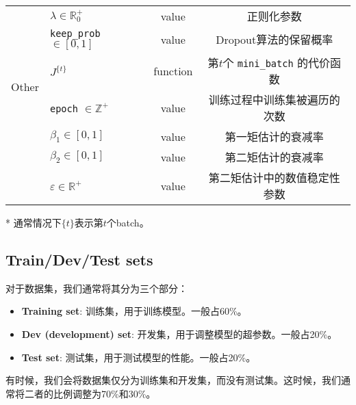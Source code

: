 \begin{table}[htb!]
\begin{threeparttable}
\begin{tabular}{clcc}
        \midrule
        \multirow{6}{*}{Other}      & $\lambda \in \mathbb{R}^+_0$                                                          & value                & 正则化参数                                                             \\  
                                    & \verb|keep_prob| $\in [0,1]$                                                          & value                & Dropout算法的保留概率                                                   \\ 
                                    & $J^{\{t\}}$                                                                           & function             & 第$t$个 \verb|mini_batch| 的代价函数                                   \\  
                                    & \verb|epoch| $\in \mathbb{Z}^+$                                                       & value                & 训练过程中训练集被遍历的次数                                           \\
                                    & $\beta_1 \in [0,1]$                                                                   & value                & 第一矩估计的衰减率 \\ 
                                    & $\beta_2 \in [0,1]$                                                                   & value                & 第二矩估计的衰减率                                                    \\ 
                                    & $\varepsilon \in \mathbb{R}^+$                                                        & value                & 第二矩估计中的数值稳定性参数                                            \\
        \bottomrule
    \end{tabular}
    \label{tab:notations-chap2} %
    \begin{tablenotes}
        \item[*] 通常情况下${\{t\}}$表示第$t$个batch。
    \end{tablenotes}
    \end{threeparttable}
\end{table}

\subsection{Train/Dev/Test sets}
对于数据集，我们通常将其分为三个部分：
\begin{itemize}
    \item \textbf{Training set}: 训练集，用于训练模型。一般占60\%。
    \item \textbf{Dev (development) set}: 开发集，用于调整模型的超参数。一般占20\%。
    \item \textbf{Test set}: 测试集，用于测试模型的性能。一般占20\%。
\end{itemize}
有时候，我们会将数据集仅分为训练集和开发集，而没有测试集。这时候，我们通常将二者的比例调整为70\%和30\%。

